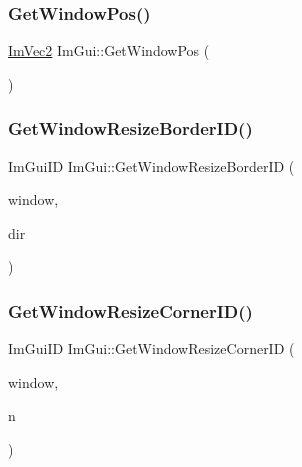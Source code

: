 \subsubsection{\texorpdfstring{Get\+Window\+Pos()}{GetWindowPos()}}
{\footnotesize\ttfamily \hyperlink{structImVec2}{Im\+Vec2} Im\+Gui\+::\+Get\+Window\+Pos (\begin{DoxyParamCaption}{ }\end{DoxyParamCaption})}

\mbox{\label{namespaceImGui_aed2c39ff4f7790fe03b4d9b2893d4ef4}} 
\subsubsection{\texorpdfstring{Get\+Window\+Resize\+Border\+I\+D()}{GetWindowResizeBorderID()}}
{\footnotesize\ttfamily Im\+Gui\+ID Im\+Gui\+::\+Get\+Window\+Resize\+Border\+ID (\begin{DoxyParamCaption}\item[{\hyperlink{structImGuiWindow}{Im\+Gui\+Window} $\ast$}]{window,  }\item[{Im\+Gui\+Dir}]{dir }\end{DoxyParamCaption})}

\mbox{\label{namespaceImGui_a22041ad222e2b5c86773d70d47078fa3}} 
\subsubsection{\texorpdfstring{Get\+Window\+Resize\+Corner\+I\+D()}{GetWindowResizeCornerID()}}
{\footnotesize\ttfamily Im\+Gui\+ID Im\+Gui\+::\+Get\+Window\+Resize\+Corner\+ID (\begin{DoxyParamCaption}\item[{\hyperlink{structImGuiWindow}{Im\+Gui\+Window} $\ast$}]{window,  }\item[{int}]{n }\end{DoxyParamCaption})}

\mbox{\label{namespaceImGui_a426c9b60bf8cd3d887ba50366a2612df}} 
